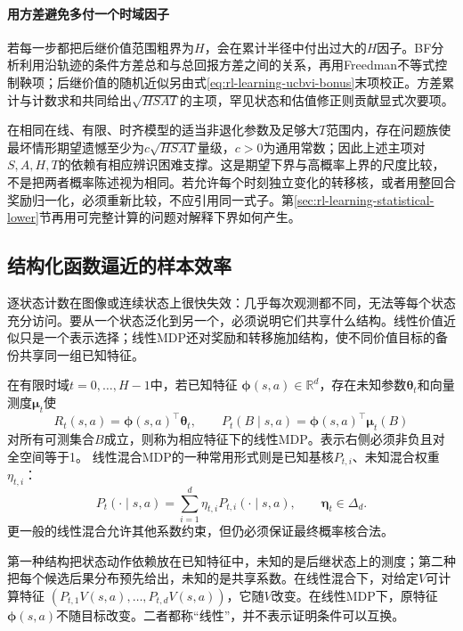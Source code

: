 \paragraph{用方差避免多付一个时域因子}
若每一步都把后继价值范围粗界为$H$，会在累计半径中付出过大的$H$因子。BF分析利用沿轨迹的条件方差总和与总回报方差之间的关系，再用Freedman不等式控制鞅项；后继价值的随机近似另由式\eqref{eq:rl-learning-ucbvi-bonus}末项校正。方差累计与计数求和共同给出$\sqrt{HSAT}$的主项，罕见状态和估值修正则贡献显式次要项。

在相同在线、有限、时齐模型的适当非退化参数及足够大$T$范围内，存在问题族使最坏情形期望遗憾至少为$c\sqrt{HSAT}$量级，$c>0$为通用常数；因此上述主项对$S,A,H,T$的依赖有相应辨识困难支撑。这是期望下界与高概率上界的尺度比较，不是把两者概率陈述视为相同。若允许每个时刻独立变化的转移核，或者用整回合奖励归一化，必须重新比较，不应引用同一式子。第\ref{sec:rl-learning-statistical-lower}节再用可完整计算的问题对解释下界如何产生。

\subsection{结构化函数逼近的样本效率}
\label{sec:rl-learning-linear-complexity}

逐状态计数在图像或连续状态上很快失效：几乎每次观测都不同，无法等每个状态充分访问。要从一个状态泛化到另一个，必须说明它们共享什么结构。线性价值近似只是一个表示选择；线性MDP还对奖励和转移施加结构，使不同价值目标的备份共享同一组已知特征。

\begin{definition}[线性MDP与线性混合MDP]
  \label{def:rl-learning-linear-mdp}
  在有限时域$t=0,\ldots,H-1$中，若已知特征
  $\bm\phi(s,a)\in\mathbb R^d$，存在未知参数$\bm\theta_t$和向量测度$\bm\mu_t$使
  \[
    R_t(s,a)=\bm\phi(s,a)^\top\bm\theta_t,\qquad
    P_t(B\mid s,a)=\bm\phi(s,a)^\top\bm\mu_t(B)
  \]
  对所有可测集合$B$成立，则称为相应特征下的线性MDP。表示右侧必须非负且对全空间等于1。
  线性混合MDP的一种常用形式则是已知基核$P_{t,i}$、未知混合权重$\eta_{t,i}$：
  \[
    P_t(\cdot\mid s,a)=\sum_{i=1}^d\eta_{t,i}P_{t,i}(\cdot\mid s,a),
       \qquad \bm\eta_t\in\Delta_d.
  \]
  更一般的线性混合允许其他系数约束，但仍必须保证最终概率核合法。
\end{definition}

第一种结构把状态动作依赖放在已知特征中，未知的是后继状态上的测度；第二种把每个候选后果分布预先给出，未知的是共享系数。在线性混合下，对给定$V$可计算特征
$(P_{t,1}V(s,a),\ldots,P_{t,d}V(s,a))$，它随$V$改变。在线性MDP下，原特征$\bm\phi(s,a)$不随目标改变。二者都称“线性”，并不表示证明条件可以互换。


